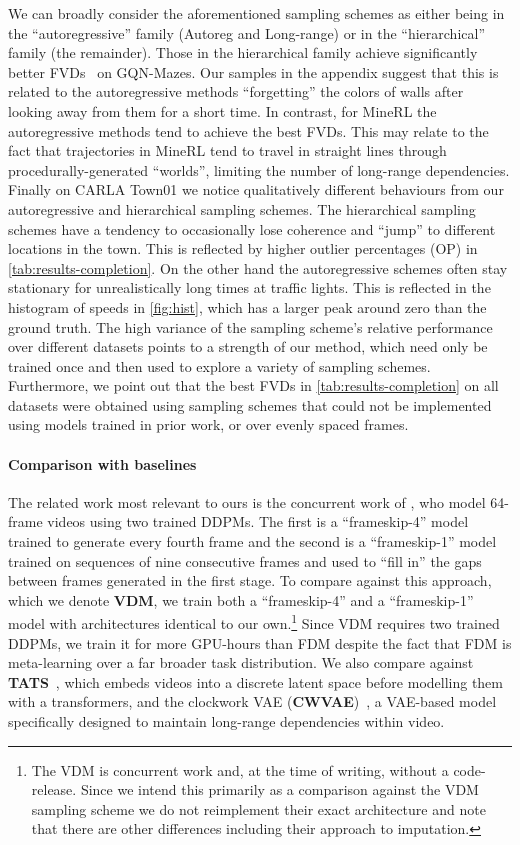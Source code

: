 We can broadly consider the aforementioned sampling schemes as either being in the ``autoregressive'' family (Autoreg and Long-range) or in the ``hierarchical'' family (the remainder). Those in the hierarchical family achieve significantly better FVDs~\cite{unterthiner2018towards} on GQN-Mazes. Our samples in the appendix suggest that this is related to the autoregressive methods ``forgetting'' the colors of walls after looking away from them for a short time. In contrast, for MineRL the autoregressive methods tend to achieve the best FVDs. This may relate to the fact that trajectories in MineRL tend to travel in straight lines through procedurally-generated ``worlds''\cite{guss2019minerl,saxena2021clockwork}, limiting the number of long-range dependencies. 
Finally on CARLA Town01 we notice qualitatively different behaviours from our autoregressive and hierarchical sampling schemes. The hierarchical
sampling schemes have a tendency to occasionally lose coherence and ``jump'' 
to different locations in the town. This is reflected by higher outlier percentages (OP) in \cref{tab:results-completion}. On the other hand the autoregressive schemes often stay stationary for unrealistically long times at traffic lights. This is reflected in the histogram of speeds in \cref{fig:hist}, which has a larger peak around zero than the ground truth. The high variance of the sampling scheme's relative performance over different datasets points to a strength of our method, which need only be trained once and then used to explore a variety of sampling schemes. Furthermore, we point out that the best FVDs in \cref{tab:results-completion} on all datasets were obtained using sampling schemes that could not be implemented using models trained in prior work, or over evenly spaced frames.

\paragraph{Comparison with baselines}
The related work most relevant to ours is the concurrent work of \citet{ho2022video}, who model 64-frame videos using two trained DDPMs. The first is a ``frameskip-4'' model trained to generate every fourth frame and the second is a ``frameskip-1'' model trained on sequences of nine consecutive frames and used to ``fill in'' the gaps between frames generated in the first stage. To compare against this approach, which we denote \textbf{VDM}, we train both a ``frameskip-4'' and a ``frameskip-1'' model with architectures identical to our own.\footnote{The VDM is concurrent work and, at the time of writing, without a code-release. Since we intend this primarily as a comparison against the VDM sampling scheme we do not reimplement their exact architecture and note that there are other differences including their approach to imputation.} Since VDM requires two trained DDPMs, we train it for more GPU-hours than FDM despite the fact that FDM is meta-learning over a far broader task distribution. We also compare against \textbf{TATS}~\citep{ge2022long}, which embeds videos into a discrete latent space before modelling them with a transformers, and the clockwork VAE (\textbf{CWVAE})~\citep{saxena2021clockwork}, a VAE-based model specifically designed to maintain long-range dependencies within video.

